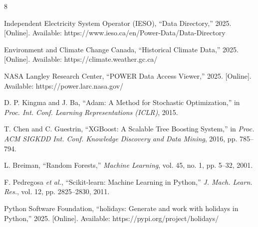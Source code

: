 \documentclass[conference]{IEEEtran}
\begin{document}
\begin{thebibliography}{8}

Independent Electricity System Operator (IESO), ``Data Directory,'' 2025. [Online]. Available: https://www.ieso.ca/en/Power-Data/Data-Directory

Environment and Climate Change Canada, ``Historical Climate Data,'' 2025. [Online]. Available: https://climate.weather.gc.ca/

NASA Langley Research Center, ``POWER Data Access Viewer,'' 2025. [Online]. Available: https://power.larc.nasa.gov/

D. P. Kingma and J. Ba, ``Adam: A Method for Stochastic Optimization,'' in \textit{Proc. Int. Conf. Learning Representations (ICLR)}, 2015.

T. Chen and C. Guestrin, ``XGBoost: A Scalable Tree Boosting System,'' in \textit{Proc. ACM SIGKDD Int. Conf. Knowledge Discovery and Data Mining}, 2016, pp. 785--794.

L. Breiman, ``Random Forests,'' \textit{Machine Learning}, vol. 45, no. 1, pp. 5--32, 2001.

F. Pedregosa \textit{et al.}, ``Scikit-learn: Machine Learning in Python,'' \textit{J. Mach. Learn. Res.}, vol. 12, pp. 2825--2830, 2011.

Python Software Foundation, ``holidays: Generate and work with holidays in Python,'' 2025. [Online]. Available: https://pypi.org/project/holidays/

\end{thebibliography}
\end{document}
